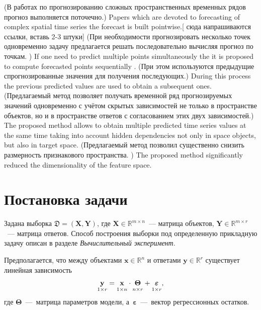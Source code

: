 \documentclass[12pt,twoside]{article}
\newcommand{\bx}{\mathbf{x}}
\newcommand{\by}{\mathbf{y}}
\newcommand{\bY}{\mathbf{Y}}
\newcommand{\bX}{\mathbf{X}}
\newcommand{\bTheta}{\boldsymbol{\Theta}}
\begin{document}
(В работах по прогнозированию сложных пространственных временных рядов прогноз выполняется поточечно.)
Papers which are devoted to forecasting of complex spatial time series the forecast is built pointwise.[{\color{red} сюда напрашиваются ссылки, вставь 2-3 штуки}]
(При необходимости прогнозировать несколько точек одновременно задачу предлагается решать последовательно вычисляя прогноз по точкам. )
If one need to predict multiple points simultaneously the it is proposed to compute forecasted points sequentially .
(При этом используются предыдущие спрогнозированные значения для получения последующих.)
During this process the previous predicted values are used to obtain a subsequent ones.
(Предлагаемый метод позволяет получать временной ряд прогнозируемых значений одновременно с учётом скрытых зависимостей не только в пространстве объектов, но и в пространстве ответов с согласованием этих двух зависимостей.)
The proposed method allows to obtain multiple predicted time series values at the same time taking into account hidden dependencies not only in space objects, but also in target space.
(Предлагаемый метод позволил существенно снизить размерность признакового пространства. )
The proposed method significantly reduced the dimensionality of the feature space.
 

\section{Постановка задачи}
Задана выборка $\mathfrak{D}= \left( \bX, \bY \right)$, где $\mathbf{X} \in \mathbb{R}^{m \times n}$~--- матрица объектов, $\mathbf{Y} \in \mathbb{R}^{m \times r}$~--- матрица ответов. 
Способ построения выборки под определенную прикладную задачу описан в разделе \textit{Вычислительный эксперимент}.

Предполагается, что между объектами $\bx \in \mathbb{R}^n$ и ответами $\by \in \mathbb{R}^r$ существует линейная зависимость 
\begin{equation}
 \underset{1 \times r}{\by} = \underset{1 \times n}{\vphantom{\by}\bx} \cdot \underset{n \times r}{\vphantom{\by}\bTheta} + \underset{1 \times r}{\vphantom{\by}\boldsymbol{\varepsilon}}, 
\label{eq::model}
\end{equation}
где $\bTheta$~---~матрица параметров модели, а~$\boldsymbol{\varepsilon}$~---~вектор регрессионных остатков.
\end{document}
